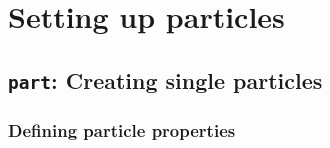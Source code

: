 %  
%   
%  
%  
%
\chapter{Setting up particles}
\label{chap:part}

\section{\texttt{part}: Creating single particles}

\subsection{Defining particle properties}
\label{ssec:particleproperties}

